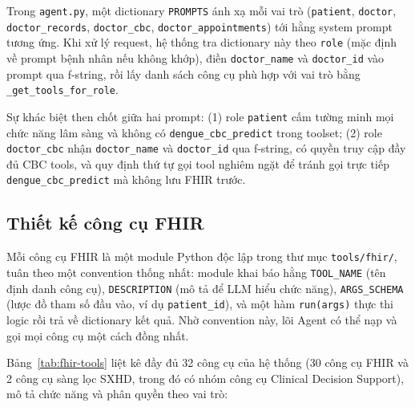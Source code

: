 \documentclass[a4paper,13pt,3p,twoside,openany]{report}
\theoremstyle{definition}
\theoremstyle{remark}
\theoremstyle{definition}
\let\ORIGsubsection\subsection
\renewcommand{\subsection}{\needspace{3\baselineskip}\ORIGsubsection}
\begin{document}
Trong \texttt{agent.py}, một dictionary \texttt{PROMPTS} ánh xạ mỗi vai trò (\texttt{patient}, \texttt{doctor}, \texttt{doctor\_records}, \texttt{doctor\_cbc}, \texttt{doctor\_appointments}) tới hằng system prompt tương ứng. Khi xử lý request, hệ thống tra dictionary này theo \texttt{role} (mặc định về prompt bệnh nhân nếu không khớp), điền \texttt{doctor\_name} và \texttt{doctor\_id} vào prompt qua f-string, rồi lấy danh sách công cụ phù hợp với vai trò bằng \texttt{\_get\_tools\_for\_role}.

Sự khác biệt then chốt giữa hai prompt: (1) role \texttt{patient} cấm tường minh mọi chức năng lâm sàng và không có \texttt{dengue\_cbc\_predict} trong toolset; (2) role \texttt{doctor\_cbc} nhận \texttt{doctor\_name} và \texttt{doctor\_id} qua f-string, có quyền truy cập đầy đủ CBC tools, và quy định thứ tự gọi tool nghiêm ngặt để tránh gọi trực tiếp \texttt{dengue\_cbc\_predict} mà không lưu FHIR trước.

\subsection{Thiết kế công cụ FHIR}

Mỗi công cụ FHIR là một module Python độc lập trong thư mục \texttt{tools/fhir/}, tuân theo một convention thống nhất: module khai báo hằng \texttt{TOOL\_NAME} (tên định danh công cụ), \texttt{DESCRIPTION} (mô tả để LLM hiểu chức năng), \texttt{ARGS\_SCHEMA} (lược đồ tham số đầu vào, ví dụ \texttt{patient\_id}), và một hàm \texttt{run(args)} thực thi logic rồi trả về dictionary kết quả. Nhờ convention này, lõi Agent có thể nạp và gọi mọi công cụ một cách đồng nhất.

Bảng~\ref{tab:fhir-tools} liệt kê đầy đủ 32 công cụ của hệ thống (30 công cụ FHIR và 2 công cụ sàng lọc SXHD, trong đó có nhóm công cụ Clinical Decision Support), mô tả chức năng và phân quyền theo vai trò:
\end{document}
